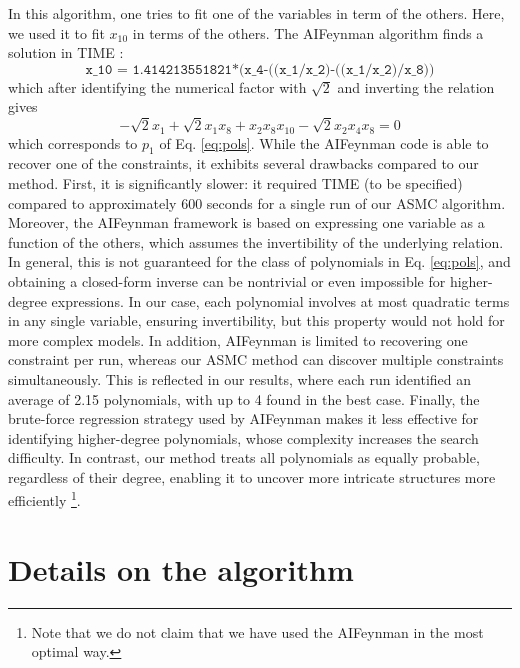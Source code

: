 \documentclass[11pt,a4paper]{article}
\begin{document}
In this algorithm, one tries to fit one of the variables in term of the others. Here, we used it to fit $x_{10}$ in terms of the others. The AIFeynman algorithm finds a solution in TIME : 
\begin{equation}
	\texttt{x\_10 = 1.414213551821*(x\_4-((x\_1/x\_2)-((x\_1/x\_2)/x\_8))}
\end{equation}
which after identifying the numerical factor with $\sqrt 2$ and inverting the relation gives 
\begin{equation}
	- \sqrt 2 x_1 + \sqrt 2 x_1 x_8 + x_2 x_8  x_{10} -\sqrt 2 x_2 x_4 x_8 = 0
\end{equation}
which corresponds to $p_1$ of Eq. \eqref{eq:pols}. While the AIFeynman code is able to recover one of the constraints, it exhibits several drawbacks compared to our method. First, it is significantly slower: it required TIME (to be specified) compared to approximately 600 seconds for a single run of our ASMC algorithm. Moreover, the AIFeynman framework is based on expressing one variable as a function of the others, which assumes the invertibility of the underlying relation. In general, this is not guaranteed for the class of polynomials in Eq. \eqref{eq:pols}, and obtaining a closed-form inverse can be nontrivial or even impossible for higher-degree expressions. In our case, each polynomial involves at most quadratic terms in any single variable, ensuring invertibility, but this property would not hold for more complex models. In addition, AIFeynman is limited to recovering one constraint per run, whereas our ASMC method can discover multiple constraints simultaneously. This is reflected in our results, where each run identified an average of 2.15 polynomials, with up to 4 found in the best case. Finally, the brute-force regression strategy used by AIFeynman makes it less effective for identifying higher-degree polynomials, whose complexity increases the search difficulty. In contrast, our method treats all polynomials as equally probable, regardless of their degree, enabling it to uncover more intricate structures more efficiently \footnote{Note that we do not claim that we have used the AIFeynman in the most optimal way.}.
\newpage
\section{Details on the algorithm}
\end{document}
